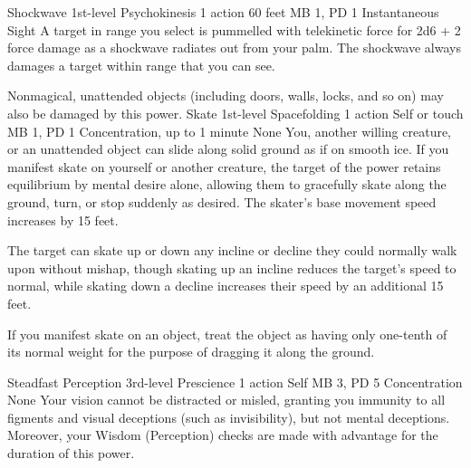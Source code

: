 \DndPowerHeader%
    {Shockwave\label{pwr:shockwave}}
    {1st-level Psychokinesis}
    {1 action}
    {60 feet}
    {MB 1, PD 1}
    {Instantaneous}
    {Sight}
A target in range you select is pummelled
with telekinetic force for 2d6 + 2 force damage as a shockwave
radiates out from your palm. The shockwave always damages
a target within range that you can see.

Nonmagical, unattended objects (including doors, walls, locks,
and so on) may also be damaged by this power.
\DndPowerHeader%
    {Skate\label{pwr:skate}}
    {1st-level Spacefolding}
    {1 action}
    {Self or touch}
    {MB 1, PD 1}
    {Concentration, up to 1 minute}
    {None}
You, another willing creature, or an unattended
object can slide along solid ground as if on smooth ice. If
you manifest skate on yourself or another creature, the target
of the power retains equilibrium by mental desire alone, allowing
them to gracefully skate along the ground, turn, or stop suddenly
as desired. The skater's base movement speed increases by
15 feet.

The target can skate up or down any incline or decline they
could normally walk upon without mishap, though skating up
an incline reduces the target's speed to normal, while skating
down a decline increases their speed by an additional 15 feet.

If you manifest skate on an object, treat the object as having
only one-tenth of its normal weight for the purpose of dragging
it along the ground.

\DndPowerHeader%
    {Steadfast Perception\label{pwr:steadfast_perception}}
    {3rd-level Prescience}
    {1 action}
    {Self}
    {MB 3, PD 5}
    {Concentration}
    {None}
Your vision cannot be distracted or misled,
granting you immunity to all figments and visual deceptions
(such as invisibility), but not mental deceptions. Moreover,
your Wisdom (Perception) checks are made with advantage for
the duration of this power.

